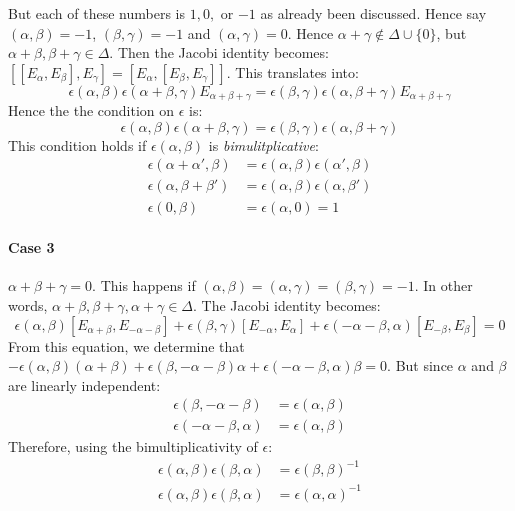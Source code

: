 \documentclass[11pt]{article}
\begin{document}
But each of these numbers is $1,0,$ or $-1$ as already been
discussed. Hence say $(\alpha,\beta)=-1$, $(\beta,\gamma)=-1$ and
$(\alpha,\gamma)=0$. Hence $\alpha + \gamma \notin \Delta \cup \{ 0
\}$, but $\alpha +\beta, \beta + \gamma \in \Delta$.  Then the Jacobi
identity becomes: $[[E_{\alpha},E_{\beta}],E_{\gamma}] =
[E_{\alpha},[E_{\beta},E_{\gamma}]]$. This translates into:
\begin{equation*}
\epsilon(\alpha,
\beta)\epsilon(\alpha+\beta,\gamma)E_{\alpha+\beta+\gamma} =
\epsilon(\beta,
\gamma)\epsilon(\alpha,\beta+\gamma)E_{\alpha+\beta+\gamma}
\end{equation*}
Hence the the condition on $\epsilon$ is:
\begin{equation*}
\epsilon(\alpha,\beta)\epsilon(\alpha+\beta,\gamma) = \epsilon(\beta,\gamma)
\epsilon(\alpha,\beta+\gamma)
\end{equation*}
This condition holds if $\epsilon(\alpha,\beta)$ is {\it bimulitplicative}:
\begin{align*}
\epsilon(\alpha+\alpha',\beta) &= \epsilon(\alpha,\beta)
\epsilon(\alpha',\beta) \\
\epsilon(\alpha,\beta+\beta') &= \epsilon(\alpha,\beta)
\epsilon(\alpha,\beta') \\
\epsilon(0,\beta) &= \epsilon(\alpha,0)=1
\end{align*}

\paragraph{Case 3}
$\alpha + \beta +\gamma = 0$. This happens if $(\alpha,\beta)=(\alpha,\gamma)
=(\beta,\gamma)=-1$. In other words, $\alpha + \beta, \beta +\gamma, \alpha
+\gamma \in \Delta$. The Jacobi identity becomes: 
\begin{equation*}
\epsilon(\alpha,\beta)[E_{\alpha+\beta},E_{-\alpha-\beta}]+ \epsilon(\beta,
\gamma)[E_{-\alpha},E_{\alpha}]+\epsilon(-\alpha-\beta,\alpha)[E_{-\beta},
E_{\beta}]=0
\end{equation*}
From this equation, we determine that $-\epsilon(\alpha,\beta)(\alpha+\beta)
+\epsilon(\beta,-\alpha-\beta)\alpha + \epsilon(-\alpha-\beta,\alpha)\beta=0$.
But since $\alpha$ and $\beta$ are linearly independent:
\begin{align*}
\epsilon(\beta,-\alpha-\beta) &=\epsilon(\alpha,\beta) \\
\epsilon(-\alpha-\beta,\alpha) &= \epsilon(\alpha,\beta)
\end{align*}
Therefore, using the bimultiplicativity of $\epsilon$:
\begin{equation}\label{equn1}
\begin{split}
\epsilon(\alpha,\beta)\epsilon(\beta,\alpha)&=\epsilon(\beta,\beta)^{-1} \\
\epsilon(\alpha,\beta)\epsilon(\beta,\alpha)&=\epsilon(\alpha,\alpha)^{-1}
\end{split}
\end{equation}
\end{document}
